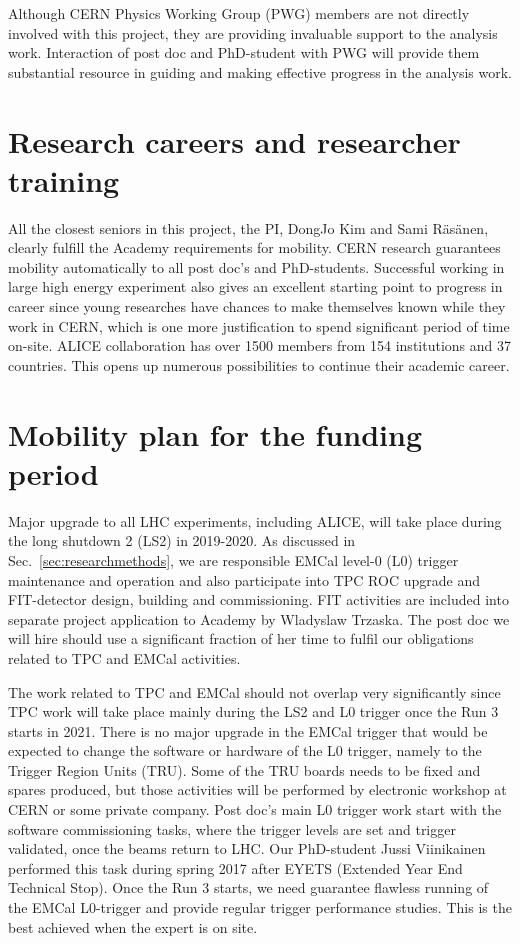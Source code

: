 Although CERN Physics Working Group (PWG) members are not directly involved with this project, they are providing invaluable support to the analysis work. Interaction of post doc and PhD-student with PWG will provide them substantial resource in guiding and making effective progress in the analysis work.

\section{Research careers and researcher training}%
\label{sec:career}

All the closest seniors in this project, the PI, DongJo Kim and Sami R\"as\"anen, clearly fulfill the Academy requirements for mobility. CERN research guarantees mobility automatically to all post doc's and PhD-students. Successful working in large high energy experiment also gives an excellent starting point to progress in career since young researches have chances to make themselves known while they work in CERN, which is one more justification to spend significant period of time on-site. ALICE collaboration has over 1500 members from 154 institutions and 37 countries. This opens up numerous possibilities to continue their academic career.

\section{Mobility plan for the funding period}%
\label{sec:mobility}

Major upgrade to all LHC experiments, including ALICE, will take place during the long shutdown 2 (LS2) in 2019-2020. As discussed in Sec.~\ref{sec:researchmethods}, we are responsible EMCal level-0 (L0) trigger maintenance and operation and also participate into TPC ROC upgrade and FIT-detector design, building and commissioning. FIT activities are included into separate project application to Academy by Wladyslaw Trzaska. The post doc we will hire should use a significant fraction of her time to fulfil our obligations related to TPC and EMCal activities.

The work related to TPC and EMCal should not overlap very significantly since TPC work will take place mainly during the LS2 and L0 trigger once the Run 3 starts in 2021. There is no major upgrade in the EMCal trigger that would be expected to change the software or hardware of the L0 trigger, namely to the Trigger Region Units (TRU). Some of the TRU boards needs to be fixed and spares produced, but those activities will be performed by electronic workshop at CERN or some private company. Post doc’s main L0 trigger work start with the software commissioning tasks, where the trigger levels are set and trigger validated, once the beams return to LHC. Our PhD-student Jussi Viinikainen performed this task during spring 2017 after EYETS (Extended Year End Technical Stop). Once the Run 3 starts, we need guarantee flawless running of the EMCal L0-trigger and provide regular trigger performance studies. This is the best achieved when the expert is on site.

